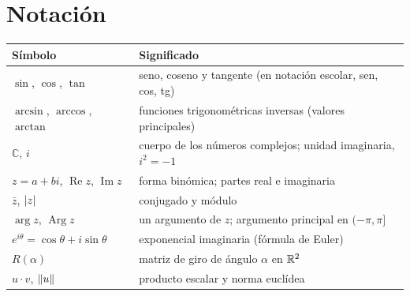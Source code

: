 \documentclass[11pt,a4paper,twoside,openany]{book}
\newcommand{\C}{\mathbb{C}}
\newcommand{\Real}{\operatorname{Re}}
\newcommand{\Imag}{\operatorname{Im}}
\newcommand{\Arg}{\operatorname{Arg}}
\begin{document}
\section*{Notación}
\begin{center}
\begin{tabular}{@{}ll@{}}
\toprule
Símbolo & Significado \\
\midrule
$\sin$, $\cos$, $\tan$ & seno, coseno y tangente (en notación escolar, sen, cos, tg) \\
$\arcsin$, $\arccos$, $\arctan$ & funciones trigonométricas inversas (valores principales) \\
$\C$, $i$ & cuerpo de los números complejos; unidad imaginaria, $i^{2}=-1$ \\
$z=a+bi$, $\Real z$, $\Imag z$ & forma binómica; partes real e imaginaria \\
$\bar z$, $\lvert z\rvert$ & conjugado y módulo \\
$\arg z$, $\Arg z$ & un argumento de $z$; argumento principal en $(-\pi,\pi]$ \\
$e^{i\theta}=\cos\theta+i\sin\theta$ & exponencial imaginaria (fórmula de Euler) \\
$R(\alpha)$ & matriz de giro de ángulo $\alpha$ en $\mathbb{R}^{2}$ \\
$u\cdot v$, $\lVert u\rVert$ & producto escalar y norma euclídea \\
\bottomrule
\end{tabular}
\end{center}


\tableofcontents

\mainmatter







\backmatter

\end{document}
